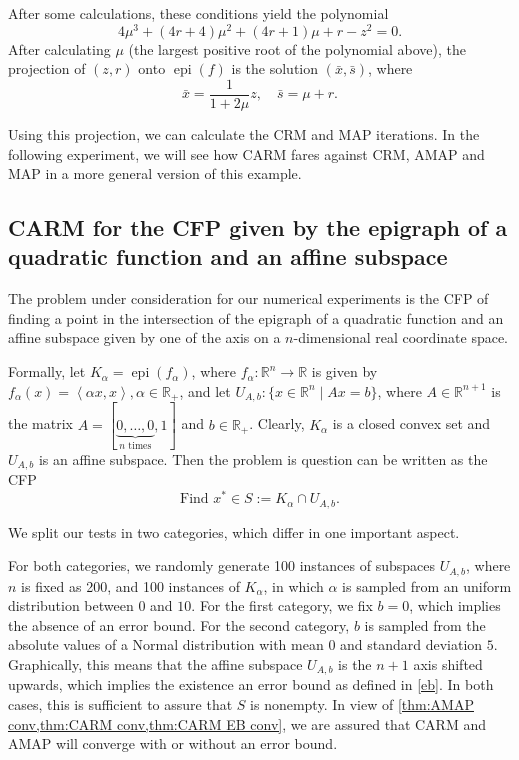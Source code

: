 \documentclass[smallextended,numbook,nospthms]{svjour3}
\theoremstyle{plain}
\theoremstyle{definition}
\def\RR{\mathds R}
\DeclareMathOperator{\epi}{epi}
\newcommand{\scal}[2]{\left\langle{#1},{#2}  \right\rangle}
\begin{document}
After some calculations, these conditions yield the polynomial
\[
4 \mu^3 + (4r+4)\mu^2 + (4r+1)\mu + r-z^2=0.
\]
After calculating $\mu$ (the largest positive root of the polynomial above), the projection of $(z,r)$ onto $\epi(f)$ is the solution $(\bar{x},\bar{s})$, where
\[
\bar{x}=\frac{1}{1+2\mu}z, \quad \bar{s}=\mu + r.
\]

Using this projection, we can calculate the CRM and MAP iterations. In the following experiment, we will see how CARM fares against CRM, AMAP and MAP in a more general version of this example.

\subsection{CARM for the CFP given by the epigraph of a quadratic function and an affine subspace}

The problem under consideration for our numerical experiments is the CFP of finding a point in the intersection of the epigraph of a quadratic function and an affine subspace given by one of the axis on a $n$-dimensional real coordinate space.

Formally, let $K_{\alpha}=\epi(f_{\alpha})$, where $f_{\alpha}:\RR^{n} \rightarrow \RR$ is given by $f_{\alpha}(x)=\scal{\alpha x}{x}, \alpha \in \RR_{+}$, and let $U_{A,b}: \{x \in \RR^n \mid Ax=b\}$, where $A \in \RR^{n+1}$ is the matrix $A=[\underbrace{0, \ldots, 0}_{n \text{ times}},1]$ and $b \in \RR_{+}$. Clearly, $K_{\alpha}$ is a closed convex set and $U_{A, b}$ is an affine subspace. Then the problem is question can be written as the CFP
\[
\text{Find } x^{*} \in S:=K_{\alpha} \cap U_{A,b}.
\]

We split our tests in two categories, which differ in one important aspect.

For both categories, we randomly generate 100 instances of subspaces $U_{A, b}$, where $n$ is fixed as 200, and 100 instances of $K_{\alpha}$, in which $\alpha$ is sampled from an uniform distribution between $0$ and $10$. For the first category, we fix $b=0$, which implies the absence of an error bound. For the second category, $b$ is sampled from the absolute values of a Normal distribution with mean $0$ and standard deviation $5$. Graphically, this means that the affine subspace $U_{A,b}$ is the $n+1$ axis shifted upwards, which implies the existence an error bound as defined in \cref{eb}. In both cases, this is sufficient to assure that $S$ is nonempty. In view of \cref{thm:AMAP conv,thm:CARM conv,thm:CARM EB conv}, we are assured that CARM and AMAP will converge with or without an error bound.
\end{document}

